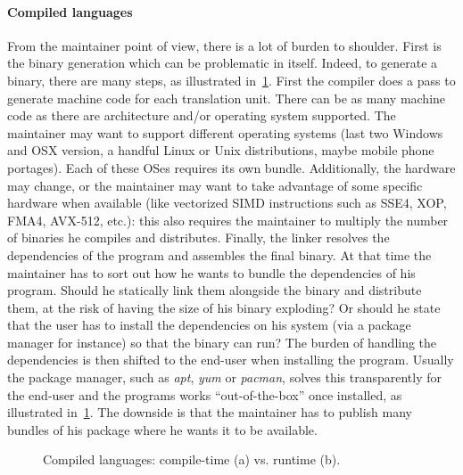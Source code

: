 \paragraph{Compiled languages} From the maintainer point of view, there is a lot of burden to shoulder. First is the
binary generation which can be problematic in itself. Indeed, to generate a binary, there are many steps, as illustrated
in~\cref{fig:static.dynamic.compiled}. First the compiler does a pass to generate machine code for each translation
unit. There can be as many machine code as there are architecture and/or operating system supported. The maintainer may
want to support different operating systems (last two Windows and OSX version, a handful Linux or Unix distributions,
maybe mobile phone portages). Each of these OSes requires its own bundle. Additionally, the hardware may change, or the
maintainer may want to take advantage of some specific hardware when available (like vectorized SIMD instructions such
as SSE4, XOP, FMA4, AVX-512, etc.): this also requires the maintainer to multiply the number of binaries he compiles and
distributes. Finally, the linker resolves the dependencies of the program and assembles the final binary. At that time
the maintainer has to sort out how he wants to bundle the dependencies of his program. Should he statically link them
alongside the binary and distribute them, at the risk of having the size of his binary exploding? Or should he state
that the user has to install the dependencies on his system (via a package manager for instance) so that the binary can
run? The burden of handling the dependencies is then shifted to the end-user when installing the program. Usually the
package manager, such as \emph{apt}, \emph{yum} or \emph{pacman}, solves this transparently for the end-user and the
programs works ``out-of-the-box'' once installed, as illustrated in~\cref{fig:static.dynamic.compiled}. The downside is
that the maintainer has to publish many bundles of his package where he wants it to be available.

\begin{figure}[htbp]
  \centering
  \hfil
  \caption{Compiled languages: compile-time (a) vs. runtime (b).}
  \label{fig:static.dynamic.compiled}
\end{figure}


